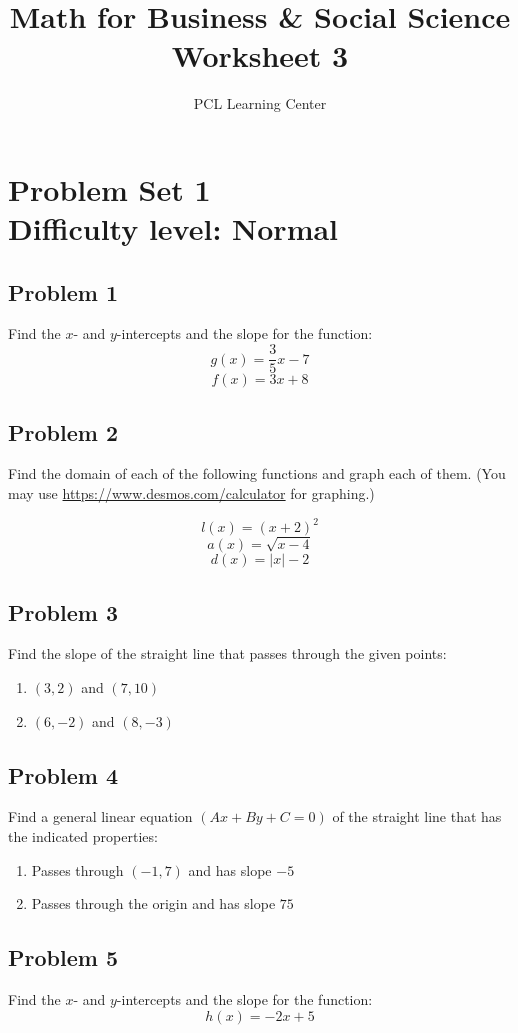 \documentclass[12pt]{article}
\title{Math for Business \& Social Science\\ Worksheet 3}
\author{PCL Learning Center}
\date{}
\begin{document}
\maketitle

\section*{Problem Set 1\\Difficulty level: Normal}
\subsection*{Problem 1}
Find the \(x\)- and \(y\)-intercepts and the slope for the function:
\[
g(x) = \dfrac{3}{5}x-7
\]
\[f(x)=3x+8\]

\subsection*{Problem 2}
Find the domain of each of the following functions and graph each of them. (You may use \url{https://www.desmos.com/calculator} for graphing.)

\[
l(x)=(x+2)^2
\]
\[a(x)=\sqrt{x-4}\]
\[d(x)=|x|-2\]

\subsection*{Problem 3}
Find the slope of the straight line that passes through the given points:
\begin{enumerate}[label=(\alph*)]
    \item \( (3, 2) \) and \( (7, 10) \)
    \item \( (6, -2) \) and \( (8, -3) \)
\end{enumerate}

\subsection*{Problem 4}
Find a general linear equation \((Ax+By+C=0)\) of the straight line that has the indicated properties:
\begin{enumerate}[label=(\alph*)]
    \item Passes through \( (-1, 7) \) and has slope \( -5 \)
    \item Passes through the origin and has slope \( 75 \)
\end{enumerate}

\subsection*{Problem 5}
Find the \(x\)- and \(y\)-intercepts and the slope for the function:
\[
h(x) = -2x + 5
\]
\end{document}

